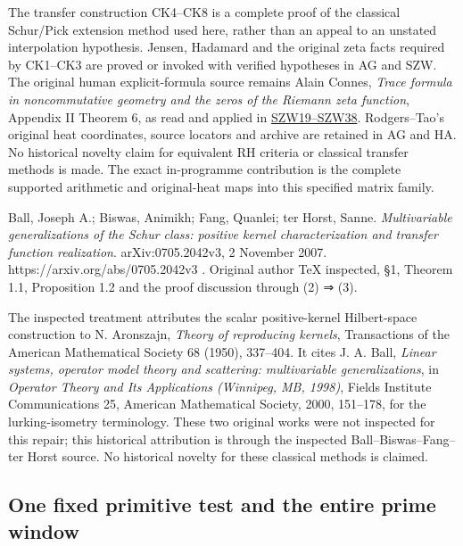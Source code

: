 \documentclass[
  10pt,
  a4paper,
]{article}
\begin{document}
The transfer construction CK4--CK8 is a complete proof of the classical
Schur/Pick extension method used here, rather than an appeal to an
unstated interpolation hypothesis. Jensen, Hadamard and the original
zeta facts required by CK1--CK3 are proved or invoked with verified
hypotheses in AG and SZW. The original human explicit-formula source
remains Alain Connes, \emph{Trace formula in noncommutative geometry and
the zeros of the Riemann zeta function}, Appendix II Theorem 6, as read
and applied in
\href{https://github.com/KokunoYumeto/zeta-function-research-reader/blob/3c022a0adde0a6aa3d8fc8e43ef42795d88e44b0/workbenches/splitzero-tandem/branches/tau-zero-prime-positivity/SUPPORTED_ZERO_PRIME_WEIL_DERIVATION.md}{SZW19--SZW38}.
Rodgers--Tao's original heat coordinates, source locators and archive
are retained in AG and HA. No historical novelty claim for equivalent RH
criteria or classical transfer methods is made. The exact in-programme
contribution is the complete supported arithmetic and original-heat maps
into this specified matrix family.

Ball, Joseph A.; Biswas, Animikh; Fang, Quanlei; ter Horst, Sanne.
\emph{Multivariable generalizations of the Schur class: positive kernel
characterization and transfer function realization}. arXiv:0705.2042v3,
2 November 2007. https://arxiv.org/abs/0705.2042v3 . Original author TeX
inspected, §1, Theorem 1.1, Proposition 1.2 and the proof discussion
through (2) ⇒ (3).

The inspected treatment attributes the scalar positive-kernel
Hilbert-space construction to N. Aronszajn, \emph{Theory of reproducing
kernels}, Transactions of the American Mathematical Society 68 (1950),
337--404. It cites J. A. Ball, \emph{Linear systems, operator model
theory and scattering: multivariable generalizations}, in \emph{Operator
Theory and Its Applications (Winnipeg, MB, 1998)}, Fields Institute
Communications 25, American Mathematical Society, 2000, 151--178, for
the lurking-isometry terminology. These two original works were not
inspected for this repair; this historical attribution is through the
inspected Ball--Biswas--Fang--ter Horst source. No historical novelty
for these classical methods is claimed.

\subsection{One fixed primitive test and the entire prime
window}\label{one-fixed-primitive-test-and-the-entire-prime-window}
\end{document}
